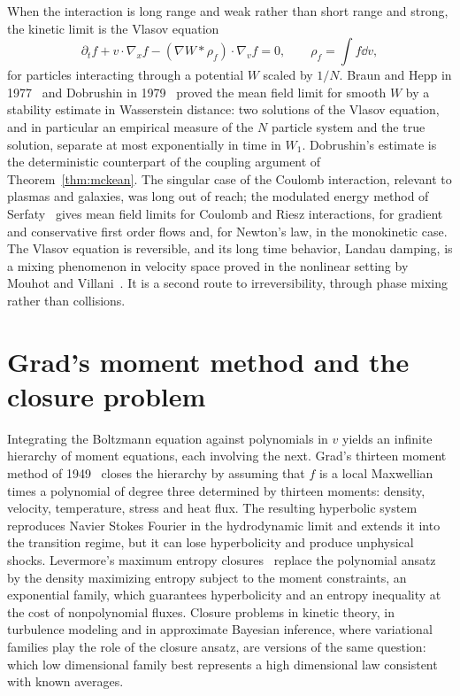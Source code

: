 When the interaction is long range and weak rather than short range and strong, the kinetic limit is the Vlasov equation
\[
\partial_tf+v\cdot\nabla_xf-(\nabla W*\rho_f)\cdot\nabla_vf = 0,\qquad\rho_f = \int f\dd v,
\]
for particles interacting through a potential $W$ scaled by $1/N$. Braun and Hepp in 1977~\cite{braunhepp1977} and Dobrushin in 1979~\cite{dobrushin1979} proved the mean field limit for smooth $W$ by a stability estimate in Wasserstein distance: two solutions of the Vlasov equation, and in particular an empirical measure of the $N$ particle system and the true solution, separate at most exponentially in time in $W_1$. Dobrushin's estimate is the deterministic counterpart of the coupling argument of Theorem~\ref{thm:mckean}. The singular case of the Coulomb interaction, relevant to plasmas and galaxies, was long out of reach; the modulated energy method of Serfaty~\cite{serfaty2020} gives mean field limits for Coulomb and Riesz interactions, for gradient and conservative first order flows and, for Newton's law, in the monokinetic case. The Vlasov equation is reversible, and its long time behavior, Landau damping, is a mixing phenomenon in velocity space proved in the nonlinear setting by Mouhot and Villani~\cite{mouhotvillani2011}. It is a second route to irreversibility, through phase mixing rather than collisions.

\section{Grad's moment method and the closure problem}

Integrating the Boltzmann equation against polynomials in $v$ yields an infinite hierarchy of moment equations, each involving the next. Grad's thirteen moment method of 1949~\cite{grad1949} closes the hierarchy by assuming that $f$ is a local Maxwellian times a polynomial of degree three determined by thirteen moments: density, velocity, temperature, stress and heat flux. The resulting hyperbolic system reproduces Navier Stokes Fourier in the hydrodynamic limit and extends it into the transition regime, but it can lose hyperbolicity and produce unphysical shocks. Levermore's maximum entropy closures~\cite{levermore1996} replace the polynomial ansatz by the density maximizing entropy subject to the moment constraints, an exponential family, which guarantees hyperbolicity and an entropy inequality at the cost of nonpolynomial fluxes. Closure problems in kinetic theory, in turbulence modeling and in approximate Bayesian inference, where variational families play the role of the closure ansatz, are versions of the same question: which low dimensional family best represents a high dimensional law consistent with known averages.


